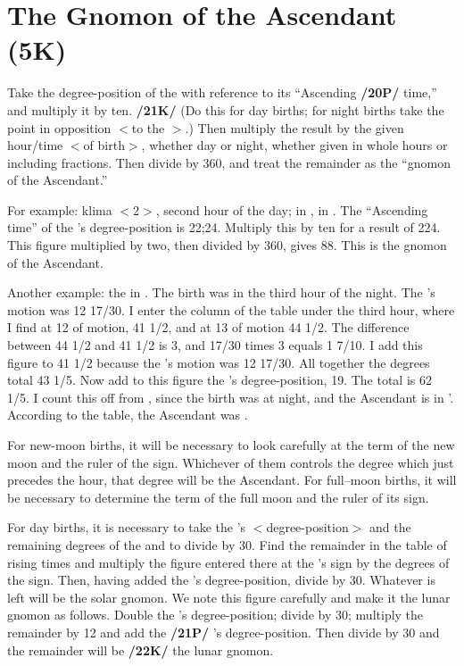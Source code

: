 \section{The Gnomon of the Ascendant (5K)}

Take the degree-position of the \Sun\xspace with reference to its “Ascending \textbf{/20P/} time,” and multiply it by ten. \textbf{/21K/} (Do this for day births; for night births take the point in opposition $<$to the \Sun$>$.) Then multiply the result by the given hour/time $<$of birth$>$, whether day or night, whether given in whole hours or including fractions. Then divide by 360, and treat the remainder as the “gnomon of the Ascendant.”

For example: klima $<$2$>$, second hour of the day; \Sun\xspace in \Cancer\xspace 21\deg, \Moon\xspace in \Aries\xspace 22\deg. The “Ascending time” of the \Sun’s degree-position is 22;24. Multiply this by ten for a result of 224. This figure multiplied by two, then divided by 360\deg, gives 88. This is the gnomon of the Ascendant.

Another example: the \Sun\xspace in \Capricorn\xspace 19\deg. The birth was in the third hour of the night. The \Moon’s motion was 12 17/30\deg. I enter the column of the table under the third hour, where I find at 12 of motion, 41 1/2, and at 13 of motion 44 1/2. The difference between 44 1/2 and 41 1/2 is 3, and 17/30\deg\xspace times 3 equals 1 7/10\deg. I add this figure to 41 1/2 because the \Moon’s motion was 12 17/30\deg. All
together the degrees total 43 1/5. Now add to this figure the \Sun’s degree-position, 19\deg. The total is 62 1/5\deg. I count this off from \Cancer\xspace, since the birth was at night, and the Ascendant is in \Virgo\xspace 2'.
According to the table, the Ascendant was \Virgo\xspace 3\deg.

For new-moon births, it will be necessary to look carefully at the term of the new moon and the ruler of the sign. Whichever of them controls the degree which just precedes the hour, that degree will be the Ascendant. For full–moon births, it will be necessary to determine the term of the full moon and the ruler
of its sign.

For day births, it is necessary to take the \Sun’s $<$degree-position$>$ and the remaining degrees of the \Moon and to divide by 30. Find the remainder in the table of rising times and multiply the figure entered there at the \Sun’s sign by the degrees of the sign. Then, having added the \Sun’s degree-position, divide by 30. Whatever is left will be the solar gnomon. We note this figure carefully and make it the lunar gnomon as follows. Double the \Moon’s degree-position; divide by 30; multiply the remainder by 12 and add the \textbf{/21P/} \Moon’s degree-position. Then divide by 30 and the remainder will be \textbf{/22K/} the lunar gnomon.


